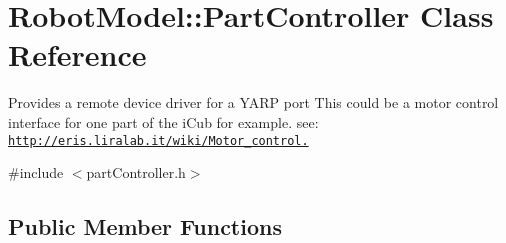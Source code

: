 \hypertarget{class_robot_model_1_1_part_controller}{
\section{RobotModel::PartController Class Reference}
\label{class_robot_model_1_1_part_controller}
}


Provides a remote device driver for a YARP port This could be a motor control interface for one part of the iCub for example. see: \href{http://eris.liralab.it/wiki/Motor_control.}{\tt http://eris.liralab.it/wiki/Motor\_\-control.}  


{\ttfamily \#include $<$partController.h$>$}\subsection*{Public Member Functions}
